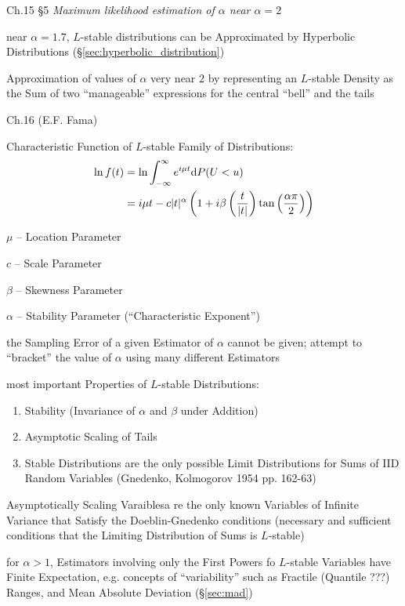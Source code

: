 Ch.15 \S 5 \emph{Maximum likelihood estimation of $\alpha$ near $\alpha = 2$}

near $\alpha = 1.7$, $L$-stable distributions can be Approximated by Hyperbolic
Distributions (\S\ref{sec:hyperbolic_distribution})

Approximation of values of $\alpha$ very near $2$ by representing an $L$-stable
Density as the Sum of two ``manageable'' expressions for the central ``bell''
and the tails

Ch.16 (E.F. Fama)

Characteristic Function of $L$-stable Family of Distributions:
\begin{align*}
  \ln f(t) & = \ln \int_{-\infty}^\infty e^{i\mu t} \mathrm{d}P(U < u) \\
           & = i\mu t - c|t|^\alpha \left(
              1 + i\beta\left(\frac{t}{|t|}\right)
              \tan\left(\frac{\alpha\pi}{2}\right)
           \right) \\
\end{align*}

$\mu$ -- Location Parameter

$c$ -- Scale Parameter

$\beta$ -- Skewness Parameter

$\alpha$ -- Stability Parameter (``Characteristic Exponent'')

the Sampling Error of a given Estimator of $\alpha$ cannot be given; attempt to
``bracket'' the value of $\alpha$ using many different Estimators

most important Properties of $L$-stable Distributions:
\begin{enumerate}
  \item Stability (Invariance of $\alpha$ and $\beta$ under Addition)
  \item Asymptotic Scaling of Tails
  \item Stable Distributions are the only possible Limit Distributions for Sums
    of IID Random Variables (Gnedenko, Kolmogorov 1954 pp. 162-63)
\end{enumerate}

Asymptotically Scaling Varaiblesa re the only known Variables of Infinite
Variance that Satisfy the Doeblin-Gnedenko conditions (necessary and sufficient
conditions that the Limiting Distribution of Sums is $L$-stable)

for $\alpha > 1$, Estimators involving only the First Powers fo $L$-stable
Variables have Finite Expectation, e.g. concepts of ``variability'' such as
Fractile (Quantile ???) Ranges, and Mean Absolute Deviation (\S\ref{sec:mad})

